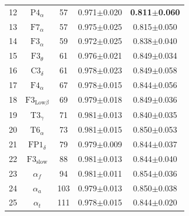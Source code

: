 \documentclass[pdflatex,sn-mathphys]{sn-jnl}%
\theoremstyle{thmstyleone}%
\theoremstyle{thmstyletwo}%
\theoremstyle{thmstylethree}%
\begin{document}
\begin{table}[h!]
\begin{tabular}{r|cccc}
  12 &            $\text{P4}_{\alpha}$ &     57 &          0.971$\pm$0.020 & \textbf{0.811$\pm$0.060} \\
  13 &            $\text{F7}_{\alpha}$ &     57 &          0.975$\pm$0.025 &          0.815$\pm$0.050 \\
  14 &            $\text{F3}_{\alpha}$ &     59 &          0.972$\pm$0.025 &          0.838$\pm$0.040 \\
  15 &            $\text{F3}_{\theta}$ &     61 &          0.976$\pm$0.021 &          0.849$\pm$0.034 \\
  16 &            $\text{C3}_{\delta}$ &     61 &          0.978$\pm$0.023 &          0.849$\pm$0.058 \\
  17 &            $\text{F4}_{\alpha}$ &     67 &          0.978$\pm$0.015 &          0.844$\pm$0.056 \\
  18 &   $\text{F3}_{\text{Low}\beta}$ &     69 &          0.979$\pm$0.018 &          0.849$\pm$0.036 \\
  19 &            $\text{T3}_{\gamma}$ &     71 &          0.981$\pm$0.013 &          0.840$\pm$0.035 \\
  20 &            $\text{T6}_{\alpha}$ &     73 &          0.981$\pm$0.015 &          0.850$\pm$0.053 \\
  21 &           $\text{FP1}_{\delta}$ &     79 &          0.979$\pm$0.009 &          0.844$\pm$0.037 \\
  22 &         $\text{F3}_\text{slow}$ &     88 &          0.981$\pm$0.013 &          0.844$\pm$0.040 \\
  23 &                    $\alpha_{f}$ &     94 &          0.981$\pm$0.011 &          0.854$\pm$0.036 \\
  24 &                    $\alpha_{a}$ &    103 &          0.979$\pm$0.013 &          0.850$\pm$0.038 \\
  25 &                    $\alpha_{t}$ &    111 &          0.978$\pm$0.015 &          0.844$\pm$0.020 \\
\hline
\end{tabular}
\end{table}
\end{document}
